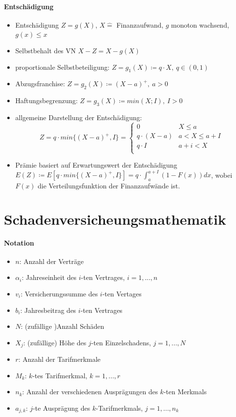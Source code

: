 \documentclass[12pt]{report}
\theoremstyle{dotless}
\theoremstyle{definition}
\begin{document}
\subsubsection{Entschädigung}
\begin{itemize}
	\item Entschädigung $Z=g(X)$, $X \hat{=}$ Finanzaufwand, $g$ monoton wachsend, $g(x) \leq x$
	\item Selbstbehalt des VN $X-Z=X-g(X)$
	\item proportionale Selbstbeteiligung: $Z=g_1(X) \coloneqq q \cdot X, \ q \in (0,1)$
	\item Abzugsfranchise: $Z=g_2(X) \coloneqq (X-a)^+, \ a>0$
	\item Haftungsbegrenzung: $Z=g_3(X) \coloneqq min(X;I), \ I>0$
	\item allgemeine Darstellung der Entschädigung:
		\begin{equation}
			Z=q \cdot min\{(X-a)^+,I\}= \begin{cases}
				0 & X \leq a \\
				q \cdot (X-a) & a<X \leq a+I \\
				q \cdot I & a+i < X \\
			\end{cases}
		\end{equation}
	\item Prämie basiert auf Erwartungswert der Entschädigung $E(Z) \coloneqq E[q \cdot min \{(X-a)^+,I\}]= q \cdot \int_a^{a+I}(1-F(x))dx$, wobei $F(x)$ die Verteilungsfunktion der Finanzaufwände ist.
\end{itemize}



\chapter{Schadenversicheungsmathematik}

\subsubsection{Notation}
\begin{itemize}
\item $n$: Anzahl der Verträge
\item $\alpha_i$: Jahreseinheit des $i$-ten Vertrages, $i=1,...,n$
\item $v_i$: Versicherungssumme des $i$-ten Vertages
\item $b_i$: Jahresbeitrag des $i$-ten Vertrages
\item $N$: (zufällige )Anzahl Schäden
\item $X_j$: (zufällige) Höhe des $j$-ten Einzelschadens, $j=1,...,N$
\item $r$: Anzahl der Tarifmerkmale
\item $M_k$: $k$-tes Tarifmerkmal, $k=1,...,r$
\item $n_k$: Anzahl der verschiedenen Ausprägungen des $k$-ten Merkmals
\item $a_{j,k}$: $j$-te Ausprägung des $k$-Tarifmerkmals, $j=1,..., n_k$
\end{itemize}
\end{document}
